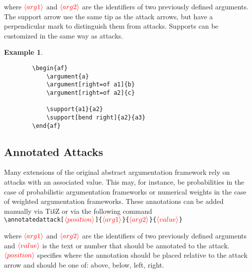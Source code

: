\documentclass{article}
\newcommand{\tikzname}{Ti\emph{k}Z\xspace}
\newcommand{\opt}[2][red]{\ensuremath{\textcolor{#1}{\langle #2\rangle}}}
\newtheorem{example}{Example}
\begin{document}
    \begin{list}{}{\leftmargin=\parindent\rightmargin=0pt}
    \item where \opt{arg1} and \opt{arg2} are the identifiers of two previously defined arguments.
    The support arrow use the same tip as the attack arrows, but have a perpendicular mark to distinguish them from attacks.
    Supports can be customized in the same way as attacks.
    \end{list}
    \begin{example}~
    \begin{verbatim}
        \begin{af}
            \argument{a}
            \argument[right=of a1]{b}
            \argument[right=of a2]{c}
    
            \support{a1}{a2}
            \support[bend right]{a2}{a3}
        \end{af}
    \end{verbatim}

    \begin{center}
        \begin{af}
    
        \end{af}    
    \end{center}
    \end{example}

\subsection{Annotated Attacks}
    Many extensions of the original abstract argumentation framework rely on attacks with an associated value.
    This may, for instance, be probabilities in the case of probabilistic argumentation frameworks or numerical weights in the case of weighted argumentation frameworks.
    These annotations can be added manually via \tikzname or via the following command\\
    
    \noindent
    \verb|\annotatedattack[|\opt{position}\verb|]{|\opt{arg1}\verb|}{|\opt{arg2}\verb|}{|\opt{value}\verb|}|
    
    \begin{list}{}{\leftmargin=\parindent\rightmargin=0pt}
        \item where \opt{arg1} and \opt{arg2} are the identifiers of two previously defined arguments and \opt{value} is the text or number that should be annotated to the attack.
        \opt{position} specifies where the annotation should be placed relative to the attack arrow and should be one of: \textsf{above}, \textsf{below}, \textsf{left}, \textsf{right}.
    \end{list}
\end{document}
